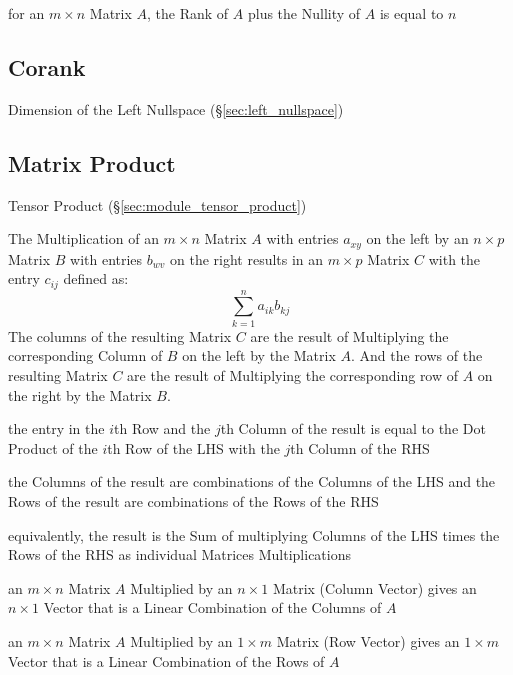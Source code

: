 for an $m \times n$ Matrix $A$, the Rank of $A$ plus the Nullity of $A$ is
equal to $n$



\subsection{Corank}\label{sec:corank}

Dimension of the Left Nullspace (\S\ref{sec:left_nullspace})



\subsection{Matrix Product}\label{sec:matrix_product}

\fist Tensor Product (\S\ref{sec:module_tensor_product})

The Multiplication of an $m \times n$ Matrix $A$ with entries $a_{xy}$
on the left by an $n \times p$ Matrix $B$ with entries $b_{wv}$ on the
right results in an $m \times p$ Matrix $C$ with the entry $c_{ij}$
defined as:
\[
  \sum_{k=1}^n a_{ik} b_{kj}
\]
The columns of the resulting Matrix $C$ are the result of Multiplying
the corresponding Column of $B$ on the left by the Matrix $A$. And the
rows of the resulting Matrix $C$ are the result of Multiplying the
corresponding row of $A$ on the right by the Matrix $B$.

the entry in the $i$th Row and the $j$th Column of the result is equal to the
Dot Product of the $i$th Row of the LHS with the $j$th Column of the RHS

the Columns of the result are combinations of the Columns of the LHS and the
Rows of the result are combinations of the Rows of the RHS

equivalently, the result is the Sum of multiplying Columns of the LHS times the
Rows of the RHS as individual Matrices Multiplications

an $m \times n$ Matrix $A$ Multiplied by an $n \times 1$ Matrix (Column Vector)
gives an $n \times 1$ Vector that is a Linear Combination of the Columns of $A$

an $m \times n$ Matrix $A$ Multiplied by an $1 \times m$ Matrix (Row Vector)
gives an $1 \times m$ Vector that is a Linear Combination of the Rows of $A$

